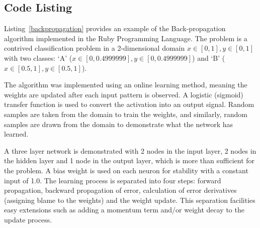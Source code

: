 \subsection{Code Listing}
Listing~\ref{backpropagation} provides an example of the Back-propagation algorithm implemented in the Ruby Programming Language. 
The problem is a contrived classification problem in a 2-dimensional domain $x\in[0,1], y\in[0,1]$ with two classes: `A' ($x\in[0,0.4999999], y\in[0,0.4999999]$) and `B' ($x\in[0.5,1], y\in[0.5,1]$).

The algorithm was implemented using an online learning method, meaning the weights are updated after each input pattern is observed. A logistic (sigmoid) transfer function is used to convert the activation into an output signal. Random samples are taken from the domain to train the weights, and similarly, random samples are drawn from the domain to demonstrate what the network has learned. 

A three layer network is demonstrated with 2 nodes in the input layer, 2 nodes in the hidden layer and 1 node in the output layer, which is more than sufficient for the problem. A bias weight is used on each neuron for stability with a constant input of 1.0. The learning process is separated into four steps: forward propagation, backward propagation of error, calculation of error derivatives (assigning blame to the weights) and the weight update. This separation facilities easy extensions such as adding a momentum term and/or weight decay to the update process.



